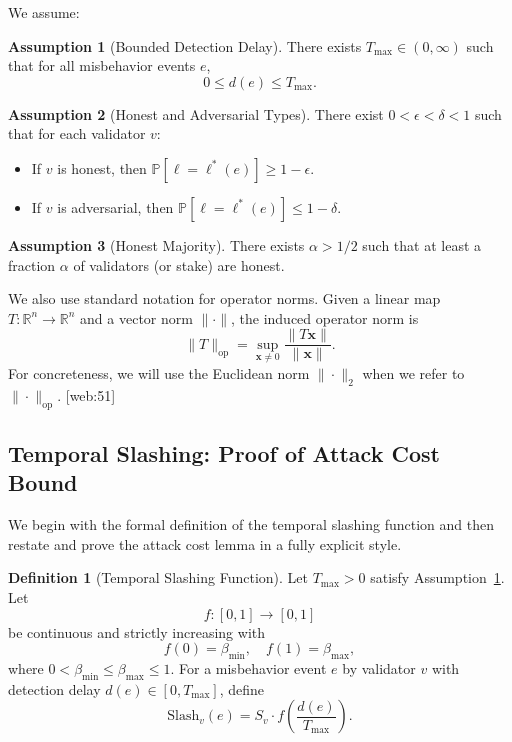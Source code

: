 \documentclass[11pt]{article}
\theoremstyle{plain}
\theoremstyle{definition}
\newtheorem{definition}{Definition}
\newtheorem{assumption}{Assumption}
\begin{document}
We assume:

\begin{assumption}[Bounded Detection Delay]
\label{ass:bounded-delay}
There exists \(T_{\max} \in (0,\infty)\) such that for all misbehavior events \(e\),
\[
0 \le d(e) \le T_{\max}.
\]
\end{assumption}

\begin{assumption}[Honest and Adversarial Types]
\label{ass:types}
There exist \(0 < \epsilon < \delta < 1\) such that for each validator \(v\):
\begin{itemize}[leftmargin=*]
  \item If \(v\) is honest, then \(\mathbb{P}[\ell = \ell^*(e)] \ge 1 - \epsilon\).
  \item If \(v\) is adversarial, then \(\mathbb{P}[\ell = \ell^*(e)] \le 1 - \delta\).
\end{itemize}
\end{assumption}

\begin{assumption}[Honest Majority]
\label{ass:honest-majority}
There exists \(\alpha > 1/2\) such that at least a fraction \(\alpha\) of validators (or stake) are honest.
\end{assumption}

We also use standard notation for operator norms. Given a linear map \(T:\mathbb{R}^n \to \mathbb{R}^n\) and a vector norm \(\|\cdot\|\), the induced operator norm is
\[
\|T\|_{\mathrm{op}} = \sup_{\bm{x} \neq 0} \frac{\|T\bm{x}\|}{\|\bm{x}\|}.
\]
For concreteness, we will use the Euclidean norm \(\|\cdot\|_2\) when we refer to \(\|\cdot\|_{\mathrm{op}}\). [web:51]

\subsection{Temporal Slashing: Proof of Attack Cost Bound}

We begin with the formal definition of the temporal slashing function and then restate and prove the attack cost lemma in a fully explicit style.

\begin{definition}[Temporal Slashing Function]
\label{def:temporal-slash}
Let \(T_{\max} > 0\) satisfy Assumption~\ref{ass:bounded-delay}. Let
\[
f : [0,1] \to [0,1]
\]
be continuous and strictly increasing with
\[
f(0) = \beta_{\min}, \quad f(1) = \beta_{\max},
\]
where \(0 < \beta_{\min} \le \beta_{\max} \le 1\).
For a misbehavior event \(e\) by validator \(v\) with detection delay \(d(e) \in [0,T_{\max}]\), define
\[
\mathrm{Slash}_v(e) = S_v \cdot f\!\left(\frac{d(e)}{T_{\max}}\right).
\]
\end{definition}
\end{document}
